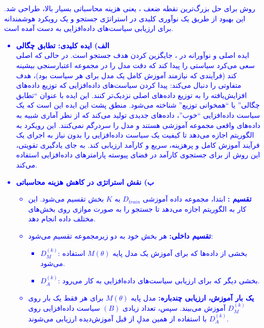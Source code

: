 \documentclass[12pt]{article}
\begin{document}
\begin{enumerate}
    \textcolor{blue}{
        روش  برای حل بزرگ‌ترین نقطه ضعف ، یعنی هزینه محاسباتی بسیار بالا، طراحی شد. این بهبود از طریق یک نوآوری کلیدی در استراتژی جستجو و یک رویکرد هوشمندانه برای ارزیابی سیاست‌های داده‌افزایی به دست آمده است.
        \begin{itemize}
            \item \textbf{الف) ایده کلیدی: تطابق چگالی}\\
            ایده اصلی و نوآورانه در ، جایگزین کردن هدف جستجو است. در حالی که  اصلی سعی می‌کرد سیاستی را پیدا کند که دقت مدل را در مجموعه اعتبارسنجی بیشینه کند (فرآیندی که نیازمند آموزش کامل یک مدل برای هر سیاست بود)،  هدف متفاوتی را دنبال می‌کند: پیدا کردن سیاست‌های داده‌افزایی که توزیع داده‌های افزایش‌یافته را به توزیع داده‌های اصلی نزدیک‌تر کنند.  
            این ایده با عنوان ``تطابق چگالی'' یا ``همخوانی توزیع'' شناخته می‌شود. منطق پشت این ایده این است که یک سیاست داده‌افزایی ``خوب''، داده‌های جدیدی تولید می‌کند که از نظر آماری شبیه به داده‌های واقعی مجموعه آموزشی هستند و مدل را سردرگم نمی‌کنند.  
            این رویکرد به الگوریتم اجازه می‌دهد تا کیفیت یک سیاست داده‌افزایی را بدون نیاز به اجرای یک فرآیند آموزش کامل و پرهزینه، سریع و کارآمد ارزیابی کند. به جای یادگیری تقویتی، این روش از  برای جستجوی کارآمد در فضای پیوسته پارامترهای داده‌افزایی استفاده می‌کند.
            \item \textbf{ب) نقش استراتژی  در کاهش هزینه محاسباتی}\\  
            \begin{itemize}
                \item \textbf{تقسیم :} ابتدا، مجموعه داده آموزشی $D_{train}$ به $K$ بخش تقسیم می‌شود. این کار به الگوریتم اجازه می‌دهد تا جستجو را به صورت موازی روی بخش‌های مختلف داده انجام دهد.  
                \item \textbf{تقسیم داخلی:} هر بخش خود به دو زیرمجموعه تقسیم می‌شود:  
                \begin{itemize}
                    \item $D_{M}^{(k)}$: بخشی از داده‌ها که برای آموزش یک مدل پایه $M(\theta)$ استفاده می‌شود.  
                    \item $D_{A}^{(k)}$: بخشی دیگر که برای ارزیابی سیاست‌های داده‌افزایی به کار می‌رود.  
                \end{itemize}
                \item \textbf{یک بار آموزش، ارزیابی چندباره:} مدل پایه $M(\theta)$ برای هر  فقط یک بار روی $D_{M}^{(k)}$ آموزش می‌بیند. سپس، تعداد زیادی $(B)$ سیاست داده‌افزایی روی $D_{A}^{(k)}$ با استفاده از همین مدلِ از قبل آموزش‌دیده ارزیابی می‌شوند.  

\end{itemize}
\end{itemize}}
\end{enumerate}
\end{document}
